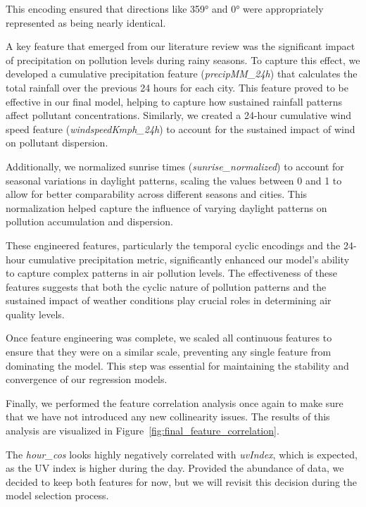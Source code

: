 \documentclass[twoside,11pt]{article}
\begin{document}
This encoding ensured that directions like 359° and 0° were appropriately represented as being nearly identical.

A key feature that emerged from our literature review was the significant impact of precipitation on pollution levels during rainy seasons. To capture this effect, we developed a cumulative precipitation feature (\textit{precipMM\_24h}) that calculates the total rainfall over the previous 24 hours for each city. This feature proved to be effective in our final model, helping to capture how sustained rainfall patterns affect pollutant concentrations. Similarly, we created a 24-hour cumulative wind speed feature (\textit{windspeedKmph\_24h}) to account for the sustained impact of wind on pollutant dispersion.

Additionally, we normalized sunrise times (\textit{sunrise\_normalized}) to account for seasonal variations in daylight patterns, scaling the values between 0 and 1 to allow for better comparability across different seasons and cities. This normalization helped capture the influence of varying daylight patterns on pollution accumulation and dispersion.

These engineered features, particularly the temporal cyclic encodings and the 24-hour cumulative precipitation metric, significantly enhanced our model's ability to capture complex patterns in air pollution levels. The effectiveness of these features suggests that both the cyclic nature of pollution patterns and the sustained impact of weather conditions play crucial roles in determining air quality levels.

Once feature engineering was complete, we scaled all continuous features to ensure that they were on a similar scale, preventing any single feature from dominating the model. This step was essential for maintaining the stability and convergence of our regression models.

Finally, we performed the feature correlation analysis once again to make sure that we have not introduced any new collinearity issues. The results of this analysis are visualized in Figure~\ref{fig:final_feature_correlation}.

The \textit{hour\_cos} looks highly negatively correlated with \textit{uvIndex}, which is expected, as the UV index is higher during the day. Provided the abundance of data, we decided to keep both features for now, but we will revisit this decision during the model selection process.
\end{document}
